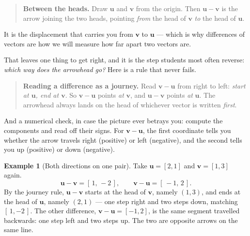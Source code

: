 \documentclass[11pt]{article}
\theoremstyle{definition}
\newtheorem{ex}{Example}
\theoremstyle{remark}
\newcommand{\vc}[1]{\mathbf{#1}}
\newcommand{\lattice}[4]{%
  \draw[step=1cm,gray!25,very thin] (#1,#3) grid (#2,#4);
  \draw[axisline] (#1,0) -- (#2+0.45,0) node[right,font=\scriptsize,black]{$x$};
  \draw[axisline] (0,#3) -- (0,#4+0.45) node[above,font=\scriptsize,black]{$y$};
}
\begin{document}
\begin{quote}
\textbf{Between the heads.} Draw $\vc{u}$ and $\vc{v}$ from the origin. Then
$\vc{u}-\vc{v}$ is the arrow joining the two heads, pointing \emph{from} the
head of $\vc{v}$ \emph{to} the head of $\vc{u}$.
\end{quote}

\noindent It is the displacement that carries you from $\vc{v}$ to $\vc{u}$ ---
which is why differences of vectors are how we will measure how far apart two
vectors are.

\smallskip
\noindent That leaves one thing to get right, and it is the step students most
often reverse: \emph{which way does the arrowhead go?} Here is a rule that never
fails.

\begin{quote}
\textbf{Reading a difference as a journey.} Read $\vc{v}-\vc{u}$ from right to
left: \emph{start at $\vc{u}$, end at $\vc{v}$}. So $\vc{v}-\vc{u}$ points
\emph{at} $\vc{v}$, and $\vc{u}-\vc{v}$ points \emph{at} $\vc{u}$. The arrowhead
always lands on the head of whichever vector is written \emph{first}.
\end{quote}

\noindent And a numerical check, in case the picture ever betrays you: compute
the components and read off their signs. For $\vc{v}-\vc{u}$, the first
coordinate tells you whether the arrow travels right (positive) or left
(negative), and the second tells you up (positive) or down (negative).

\begin{ex}[Both directions on one pair]
Take $\vc{u}=[2,1]$ and $\vc{v}=[1,3]$ again.
\[
  \vc{u}-\vc{v}=[\,1,\,-2\,],
  \qquad
  \vc{v}-\vc{u}=[\,-1,\,2\,].
\]
By the journey rule, $\vc{u}-\vc{v}$ starts at the head of $\vc{v}$, namely
$(1,3)$, and ends at the head of $\vc{u}$, namely $(2,1)$ --- one step right and
two steps down, matching $[\,1,-2\,]$. The other difference,
$\vc{v}-\vc{u}=[-1,2]$, is the same segment travelled backwards: one step left
and two steps up. The two are opposite arrows on the same line.
\end{ex}

\begin{center}
\end{center}
\end{document}
